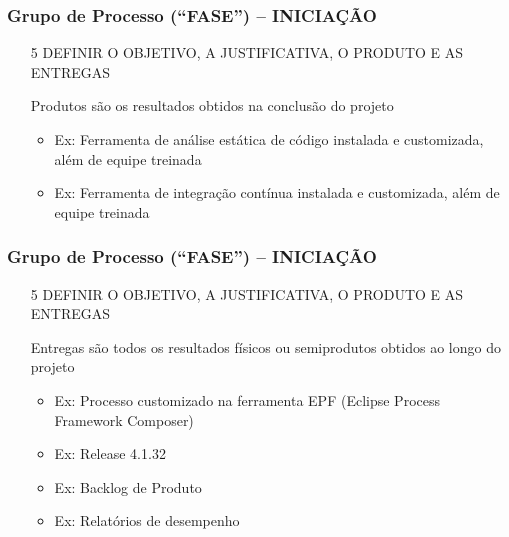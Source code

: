 \begin{frame}
   \frametitle{Grupo de Processo (“FASE”) – INICIAÇÃO}
   \begin{itemize}
    \item[5] DEFINIR O OBJETIVO, A JUSTIFICATIVA, O PRODUTO E AS ENTREGAS
    \begin{block}{}
    Produtos são os resultados obtidos na conclusão do projeto
    \end{block}

    \begin{itemize}
     \item Ex: Ferramenta de análise estática de código instalada e customizada, além de equipe treinada
     \item Ex: Ferramenta de integração contínua instalada e customizada, além de equipe treinada
   \end{itemize}
   \end{itemize}
\end{frame}

\begin{frame}
   \frametitle{Grupo de Processo (“FASE”) – INICIAÇÃO}
   \begin{itemize}
    \item[5] DEFINIR O OBJETIVO, A JUSTIFICATIVA, O PRODUTO E AS ENTREGAS
    \begin{block}{}
    Entregas são todos os resultados físicos ou semiprodutos obtidos ao longo do projeto
    \end{block}

    \begin{itemize}
     \item Ex: Processo customizado na ferramenta EPF  (Eclipse Process Framework Composer)
     \item Ex: Release 4.1.32
     \item Ex: Backlog de Produto
     \item Ex: Relatórios de desempenho
   \end{itemize}
   \end{itemize}
\end{frame}
